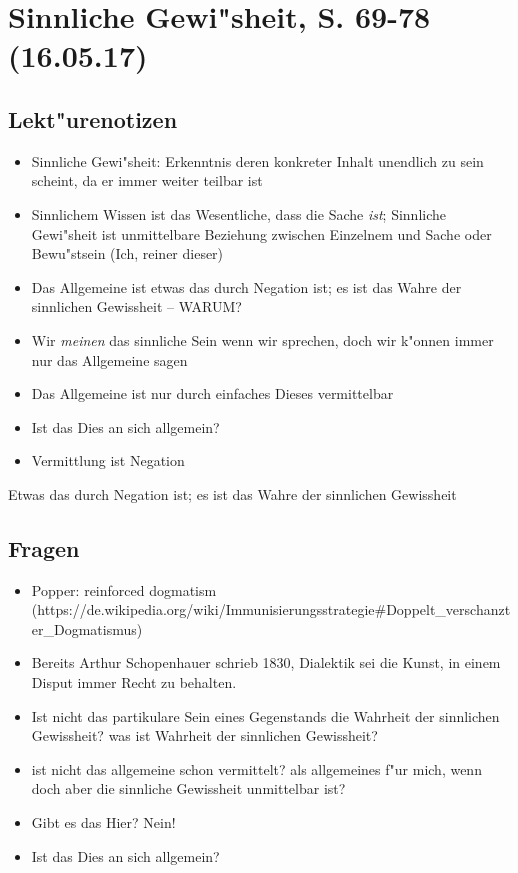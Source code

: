 \documentclass[emulatestandardclasses]{scrartcl}
\begin{document}
\section{Sinnliche Gewi"sheit, S. 69-78\\(16.05.17)}

\subsection{Lekt"urenotizen}

\begin{itemize}
  \item Sinnliche Gewi"sheit: Erkenntnis deren konkreter Inhalt unendlich zu sein scheint, da er immer weiter teilbar ist 
  \item Sinnlichem Wissen ist das Wesentliche, dass die Sache \emph{ist}; Sinnliche Gewi"sheit ist unmittelbare Beziehung zwischen Einzelnem und Sache oder Bewu"stsein (Ich, reiner dieser)
  \item Das Allgemeine ist etwas das durch Negation ist; es ist das Wahre der sinnlichen Gewissheit -- WARUM?
  \item Wir \emph{meinen} das sinnliche Sein wenn wir sprechen, doch wir k"onnen immer nur das Allgemeine sagen
  \item Das Allgemeine ist nur durch einfaches Dieses vermittelbar
  \item Ist das Dies an sich allgemein?
  \item Vermittlung ist Negation
\end{itemize}

\begin{description}[leftmargin=!,labelwidth=\widthof{\bfseries Erscheinendes Bewusstsein}]
  \item[Reines Sein]
  \item[Allgemeines] Etwas das durch Negation ist; es ist das Wahre der sinnlichen Gewissheit
\end{description}

\subsection{Fragen}

\begin{itemize}
  \item Popper: reinforced dogmatism (https://de.wikipedia.org/wiki/Immunisierungsstrategie#Doppelt_verschanzter_Dogmatismus)
  \item Bereits Arthur Schopenhauer schrieb 1830, Dialektik sei die Kunst, in einem Disput immer Recht zu behalten.
  \item Ist nicht das partikulare Sein eines Gegenstands die Wahrheit der sinnlichen Gewissheit? was ist Wahrheit der sinnlichen Gewissheit? 
  \item ist nicht das allgemeine schon vermittelt? als allgemeines f"ur mich, wenn doch aber die sinnliche Gewissheit unmittelbar ist?
  \item Gibt es das Hier? Nein!
  \item Ist das Dies an sich allgemein?
\end{itemize}
\end{document}

